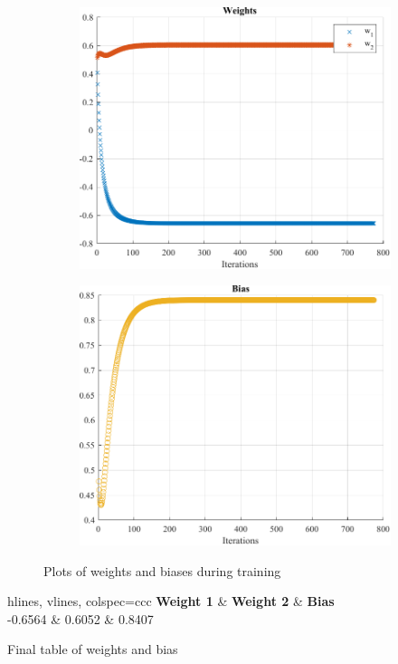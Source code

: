 \begin{figure}[htpb]
	\centering
	\begin{subfigure}[l]{0.47\textwidth}
		\centering
		\includegraphics[width=\textwidth]{../Problem 10/prob10_adaline_weights.pdf}
	\end{subfigure}
	\hspace{1mm}
	\begin{subfigure}[r]{0.47\textwidth}
		\centering
		\includegraphics[width=\textwidth]{../Problem 10/prob10_adaline_biases.pdf}
	\end{subfigure}
	\caption{Plots of weights and biases during training}
	\label{fig:prob10_plot_weights_biases}
\end{figure}

\begin{table}[htpb]
	\centering
	\begin{tblr}{hlines, vlines, colspec={ccc}}
		\textbf{Weight 1} & \textbf{Weight 2} & \textbf{Bias} \\
		-0.6564 & 0.6052 & 0.8407 \\
	\end{tblr}
	\caption{Final table of weights and bias}
	\label{table:prob10_final_weight_bias}
\end{table}